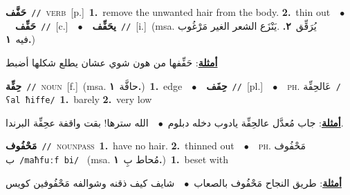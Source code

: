 \documentclass[10pt,a4paper,twoside]{article} %
\begin{document}
\begin{multicols}{2}
{\setlength\topsep{0pt}\textbf{\foreignlanguage{arabic}{حَفَّف}}\ {\color{gray}\texttt{//}\color{black}}\ \textsc{verb}\ [p.]\ \textbf{1.}~remove the unwanted hair from the body.  \textbf{2.}~thin out\ \ $\bullet$\ \ \setlength\topsep{0pt}\textbf{\foreignlanguage{arabic}{حَفِّف}}\ {\color{gray}\texttt{//}\color{black}}\ [c.]\ \ $\bullet$\ \ \setlength\topsep{0pt}\textbf{\foreignlanguage{arabic}{يحَفِّف}}\ {\color{gray}\texttt{//}\color{black}}\ [i.]\ \color{gray}(msa. \foreignlanguage{arabic}{يُرَقِّق}~\foreignlanguage{arabic}{\textbf{٢.}}  .\foreignlanguage{arabic}{يَنْزَع الشعر الغير مَرْغُوب فيه}~\foreignlanguage{arabic}{\textbf{١.}})\color{black}\  \begin{flushright}\color{gray}\foreignlanguage{arabic}{\textbf{\underline{\foreignlanguage{arabic}{أمثلة}}}: حَفِّفها من هون شوي عشان يطلع شكلها أضبط}\end{flushright}\color{black}} \vspace{2mm}

{\setlength\topsep{0pt}\textbf{\foreignlanguage{arabic}{حِفِّة}}\ {\color{gray}\texttt{//}\color{black}}\ \textsc{noun}\ [f.]\ \color{gray}(msa. \foreignlanguage{arabic}{حافَّة}~\foreignlanguage{arabic}{\textbf{١.}})\color{black}\ \textbf{1.}~edge\ \ $\bullet$\ \ \setlength\topsep{0pt}\textbf{\foreignlanguage{arabic}{حِفَف}}\ {\color{gray}\texttt{//}\color{black}}\ [pl.]\ \ $\bullet$\ \ \textsc{ph.} \color{gray} \foreignlanguage{arabic}{عَالحِفِّة}\color{black}\ {\color{gray}\texttt{/{\sffamily ʕal ħiffe}/}\color{black}}\ \textbf{1.}~barely  \textbf{2.}~very low\  \begin{flushright}\color{gray}\foreignlanguage{arabic}{\textbf{\underline{\foreignlanguage{arabic}{أمثلة}}}: جاب مُعدَّل عالحِفِّة يادوب دخله دبلوم\ $\bullet$\ \  الله سترها! بقت واقفة عحِفِّة البرندا.}\end{flushright}\color{black}} \vspace{2mm}

{\setlength\topsep{0pt}\textbf{\foreignlanguage{arabic}{مَحْفُوف}}\ {\color{gray}\texttt{//}\color{black}}\ \textsc{noun\textunderscore pass}\ \textbf{1.}~have no hair.  \textbf{2.}~thinned out\ \ $\bullet$\ \ \textsc{ph.} \color{gray} \foreignlanguage{arabic}{مَحْفُوف ب}\color{black}\ {\color{gray}\texttt{/{\sffamily maħfuːf bi}/}\color{black}}\ \color{gray} (msa. \foreignlanguage{arabic}{مُحاط بِ}~\foreignlanguage{arabic}{\textbf{١.}})\color{black}\ \textbf{1.}~beset with\  \begin{flushright}\color{gray}\foreignlanguage{arabic}{\textbf{\underline{\foreignlanguage{arabic}{أمثلة}}}: طريق النجاح مَحْفُوف بالصعاب\ $\bullet$\ \  شايف كيف ذقنه وشوالفه مَحْفُوفين كويس}\end{flushright}\color{black}} \vspace{2mm}


\end{multicols}
\end{document}
